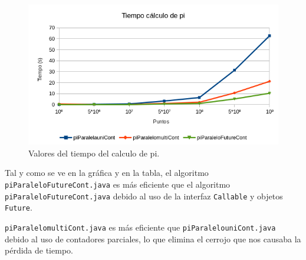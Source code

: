 \documentclass[12pt,letterpaper]{article}
\begin{document}
\begin{figure}[h]
	\begin{center}
		\includegraphics[scale=1]{TiempoPi.png}
		\caption{Valores del tiempo del calculo de pi.}
		\label{fig:Valores del calculo de pi}
	\end{center}
\end{figure}
	Tal y como se ve en la gráfica y en la tabla, el algoritmo \texttt{piParaleloFutureCont.java} es más eficiente que el algoritmo \texttt{piParaleloFutureCont.java} debido al uso de la interfaz \texttt{Callable} y objetos \texttt{Future}.
	
\texttt{piParalelomultiCont.java} es más eficiente que \texttt{piParalelouniCont.java} debido al uso de contadores parciales, lo que elimina el cerrojo que nos causaba la pérdida de tiempo.
\end{document}
